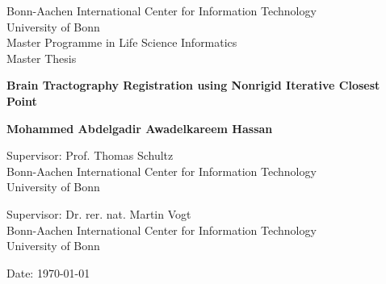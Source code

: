 \documentclass[../structure.tex]{subfiles}
\begin{document}
\begin{titlepage}
\begin{center}
		\vspace*{1cm}
        
        Bonn-Aachen International Center for Information Technology\\
        University of Bonn\\
        Master Programme in Life Science Informatics \\
        Master Thesis \\
        
        \vspace{2cm}
        
        \fontsize{18pt}{20pt}\selectfont
        \textbf{Brain Tractography Registration using Nonrigid Iterative Closest Point}
        
        \vspace{2cm}
        
        \fontsize{14pt}{20pt}\selectfont
        \textbf{Mohammed Abdelgadir Awadelkareem Hassan}
        
        \vspace{1.5cm}
        
        
        \vspace{0.2cm}
        Supervisor: Prof. Thomas Schultz \\Bonn-Aachen International Center for Information Technology \\University of Bonn
        
        \vspace{0.7cm}
        Supervisor: Dr. rer. nat. Martin Vogt \\Bonn-Aachen International Center for Information Technology \\University of Bonn
        
        
        \vspace{2cm}
        
        
        Date: \today
       
        \vspace{0.8cm}
    \end{center}
\end{titlepage}
\end{document}
